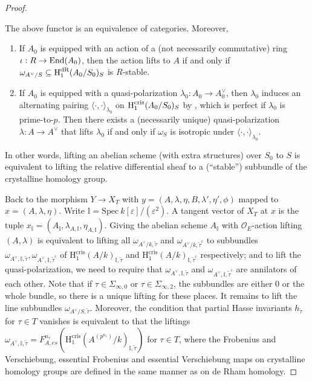 \documentclass{article}
\begin{document}
\begin{proof}
\begin{theorem}
The above functor is an equivalence of categories. Moreover,
\begin{enumerate}
	\item If $A_0$ is equipped with an action of a (not necessarily commutative) ring $\iota:R\to \textnormal{End}(A_0)$, then the action lifts to $A$ if and only if $\omega_{A^\vee/S}\subseteq\textnormal{H}_1^{\textnormal{dR}}(A_0/S_0)_S$ is $R$-stable.
	\item If $A_0$ is equipped with a quasi-polarization $\lambda_0:A_0\to A_0^\vee$, then $\lambda_0$ induces an alternating pairing $\langle\cdot,\cdot\rangle_{\lambda_0}$ on $\textnormal{H}_1^{\textnormal{cris}}(A_0/S_0)_S$ by \textnormal{\citep{BBM}}, which is perfect if $\lambda_0$ is prime-to-$p$. Then there exists a (necessarily unique) quasi-polarization $\lambda:A\to A^\vee$ that lifts $\lambda_0$ if and only if $\omega_S$ is isotropic under $\langle\cdot,\cdot\rangle_{\lambda_0}$.
\end{enumerate}
\end{theorem}
In other words, lifting an abelian scheme (with extra structures) over $S_0$ to $S$ is equivalent to lifting the relative differential sheaf to a (``stable'') subbundle of the crystalline homology group.

Back to the morphism $Y\to X_T$ with $y=(A,\lambda,\eta,B,\lambda',\eta',\phi)$ mapped to $x=(A,\lambda,\eta)$. Write $\mathbb{I}=\text{Spec}\  k[\varepsilon]/(\varepsilon^2)$. A tangent vector of $X_T$ at $x$ is the tuple $x_{\mathbb{I}}=(A_{\mathbb{I}},\lambda_{A,\mathbb{I}},\eta_{A,\mathbb{I}})$. Giving the abelian scheme $A_{\mathbb{I}}$ with $\mathcal{O}_E$-action lifting $(A,\lambda)$ is equivalent to lifting all $\omega_{A^\vee/k,\tilde\tau}$ and $\omega_{A^\vee/k,\tilde\tau^c}$ to subbundles $\omega_{A^\vee,\mathbb{I},\tilde\tau},\omega_{A^\vee,\mathbb{I},\tilde\tau^c}$ of $\text{H}^{\text{cris}}_1(A/k)_{\mathbb{I},\tilde\tau}$ and $\text{H}^{\text{cris}}_1(A/k)_{\mathbb{I},\tilde\tau^c}$ respectively; and to lift the quasi-polarization, we need to require that $\omega_{A^\vee,\mathbb{I},\tilde\tau}$ and $\omega_{A^\vee,\mathbb{I},\tilde\tau^c}$ are annilators of each other. Note that if $\tau\in \Sigma_{\infty,0}$ or $\tau\in\Sigma_{\infty,2}$, the subbundles are either $0$ or the whole bundle, so there is a unique lifting for these places. It remains to lift the line subbundles $\omega_{A^\vee/S,\tilde\tau}$. Moreover, the condition that partial Hasse invariants $h_{\tilde\tau}$ for $\tau\in T$ vanishes is equivalent to that the liftings $\omega_{A^\vee,\mathbb{I},\tilde\tau}=F^{n_\tau}_{A,es}(\text{H}_1^{\text{cris}}(A^{(p^{n_\tau})}/k)_{\mathbb{I},\tilde\tau})$ for $\tau\in T$, where the Frobenius and Verschiebung, essential Frobenius and essential Verschiebung maps on crystalline homology groups are defined in the same manner as on de Rham homology.


\end{proof}
\end{document}
